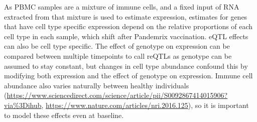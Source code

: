 As \gls{PBMC} samples are a mixture of immune cells, and a fixed input of RNA extracted from that mixture is used to estimate expression, estimates for genes that have cell type specific expression depend on the relative proportions of each cell type in each sample, which shift after Pandemrix vaccination\autocite{sobolev2016AdjuvantedInfluenzaH1N1Vaccination}.
\gls{eQTL} effects can also be cell type specific.
The effect of genotype on expression can be compared between multiple timepoints to call \glspl{reQTL} as genotype can be assumed to stay constant, 
but changes in cell type abundance confound this by modifying both expression and the effect of genotype on expression.
Immune cell abundance also varies naturally between healthy individuals (\url{https://www.sciencedirect.com/science/article/pii/S0092867414015906?via%3Dihub}, \url{https://www.nature.com/articles/nri.2016.125}), so it is important to model these effects even at baseline.

